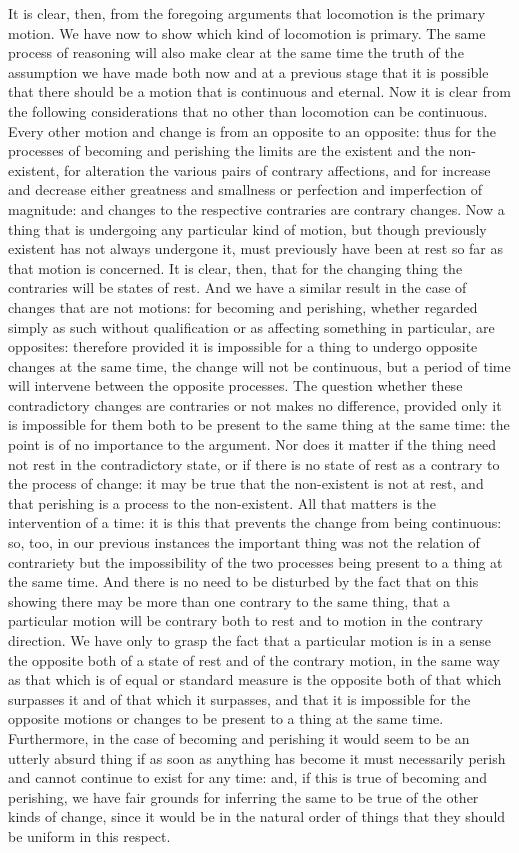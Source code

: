 It is clear, then, from the foregoing arguments that locomotion is
the primary motion. We have now to show which kind of locomotion is
primary. The same process of reasoning will also make clear at the
same time the truth of the assumption we have made both now and at
a previous stage that it is possible that there should be a motion
that is continuous and eternal. Now it is clear from the following
considerations that no other than locomotion can be continuous. Every
other motion and change is from an opposite to an opposite: thus for
the processes of becoming and perishing the limits are the existent
and the non-existent, for alteration the various pairs of contrary
affections, and for increase and decrease either greatness and smallness
or perfection and imperfection of magnitude: and changes to the respective
contraries are contrary changes. Now a thing that is undergoing any
particular kind of motion, but though previously existent has not
always undergone it, must previously have been at rest so far as that
motion is concerned. It is clear, then, that for the changing thing
the contraries will be states of rest. And we have a similar result
in the case of changes that are not motions: for becoming and perishing,
whether regarded simply as such without qualification or as affecting
something in particular, are opposites: therefore provided it is impossible
for a thing to undergo opposite changes at the same time, the change
will not be continuous, but a period of time will intervene between
the opposite processes. The question whether these contradictory changes
are contraries or not makes no difference, provided only it is impossible
for them both to be present to the same thing at the same time: the
point is of no importance to the argument. Nor does it matter if the
thing need not rest in the contradictory state, or if there is no
state of rest as a contrary to the process of change: it may be true
that the non-existent is not at rest, and that perishing is a process
to the non-existent. All that matters is the intervention of a time:
it is this that prevents the change from being continuous: so, too,
in our previous instances the important thing was not the relation
of contrariety but the impossibility of the two processes being present
to a thing at the same time. And there is no need to be disturbed
by the fact that on this showing there may be more than one contrary
to the same thing, that a particular motion will be contrary both
to rest and to motion in the contrary direction. We have only to grasp
the fact that a particular motion is in a sense the opposite both
of a state of rest and of the contrary motion, in the same way as
that which is of equal or standard measure is the opposite both of
that which surpasses it and of that which it surpasses, and that it
is impossible for the opposite motions or changes to be present to
a thing at the same time. Furthermore, in the case of becoming and
perishing it would seem to be an utterly absurd thing if as soon as
anything has become it must necessarily perish and cannot continue
to exist for any time: and, if this is true of becoming and perishing,
we have fair grounds for inferring the same to be true of the other
kinds of change, since it would be in the natural order of things
that they should be uniform in this respect. 

